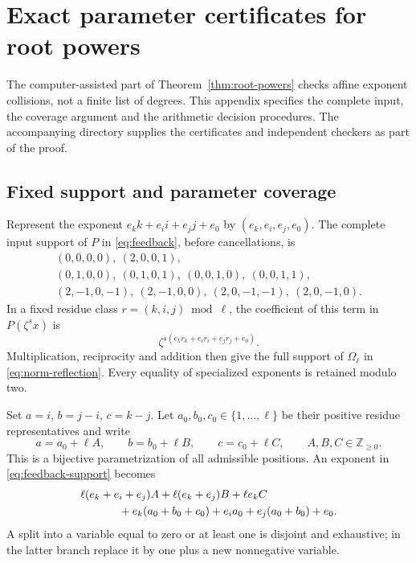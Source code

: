 \documentclass[11pt]{article}
\theoremstyle{definition}
\theoremstyle{remark}
\begin{document}
\section{Exact parameter certificates for root powers}
\label{sec:root-certificates}
The computer-assisted part of Theorem~\ref{thm:root-powers} checks
affine exponent collisions, not a finite list of degrees.
This appendix specifies the complete input, the coverage argument
and the arithmetic decision procedures. The accompanying
 directory supplies the certificates
and independent checkers as part of the proof.

\subsection{Fixed support and parameter coverage}
Represent the exponent $e_k k+e_i i+e_j j+e_0$ by
$(e_k,e_i,e_j,e_0)$. The complete input support of $P$ in
\eqref{eq:feedback}, before cancellations, is
\begin{equation}\label{eq:feedback-support}
\begin{gathered}
 (0,0,0,0),\ (2,0,0,1),\\
 (0,1,0,0),\ (0,1,0,1),\
 (0,0,1,0),\ (0,0,1,1),\\
 (2,-1,0,-1),\ (2,-1,0,0),\
 (2,0,-1,-1),\ (2,0,-1,0).
\end{gathered}
\end{equation}
In a fixed residue class $r=(k,i,j)\bmod\ell$, the coefficient
of this term in $P(\zeta^s x)$ is
\[
 \zeta^{s(e_k r_k+e_i r_i+e_j r_j+e_0)} .
\]
Multiplication, reciprocity and addition then give the full support
of $\Omega_\ell$ in \eqref{eq:norm-reflection}.
Every equality of specialized exponents is retained modulo two.

Set $a=i$, $b=j-i$, $c=k-j$.
Let $a_0,b_0,c_0\in\{1,\ldots,\ell\}$ be their positive residue
representatives and write
\[
 a=a_0+\ell A,\qquad b=b_0+\ell B,\qquad c=c_0+\ell C,
 \qquad A,B,C\in\mathbb Z_{\ge0}.
\]
This is a bijective parametrization of all admissible positions.
An exponent in \eqref{eq:feedback-support} becomes
\begin{equation}\label{eq:gap-exponent}
\begin{split}
 &\ell(e_k+e_i+e_j)A+\ell(e_k+e_j)B+\ell e_k C\\
 &\hspace{12mm}
   +e_k(a_0+b_0+c_0)+e_i a_0+e_j(a_0+b_0)+e_0 .
\end{split}
\end{equation}
A split into a variable equal to zero or at least one is disjoint
and exhaustive; in the latter branch replace it by one plus a new
nonnegative variable.
\end{document}
